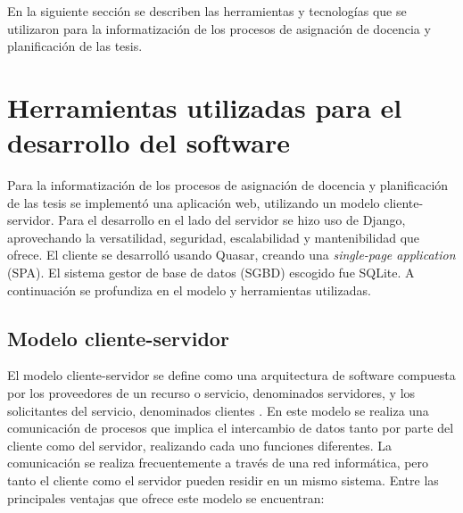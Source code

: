 






En la siguiente sección se describen las herramientas y tecnologías 
que se utilizaron para la informatización de los procesos de asignación de 
docencia y planificación de las tesis.



\section{Herramientas utilizadas para el desarrollo del software}\label{herramientas:cap1}
Para la informatización de los procesos
de asignación de docencia y planificación de las tesis
se implementó una aplicación web,
utilizando un modelo cliente-servidor.
Para el desarrollo en el lado del servidor se hizo uso de Django, aprovechando la
versatilidad, seguridad, escalabilidad y mantenibilidad
que ofrece.
El cliente se desarrolló usando Quasar, creando una
\textit{single-page application} (SPA).
El sistema gestor de base de datos (SGBD) escogido fue SQLite.
A continuación se profundiza en el modelo 
y herramientas utilizadas.



\subsection{Modelo cliente-servidor}

El modelo cliente-servidor se define como una arquitectura
de software compuesta por los proveedores de un recurso o servicio, 
denominados servidores, y los solicitantes del servicio, denominados
clientes \cite{client_server_model}. En este modelo se realiza una comunicación de procesos
que implica el intercambio de datos tanto por parte del cliente 
como del servidor, realizando cada uno funciones diferentes. La comunicación
se realiza frecuentemente a través de una red informática, pero 
tanto el cliente como el servidor pueden residir en un mismo sistema.
Entre las principales ventajas que ofrece este modelo se encuentran:

